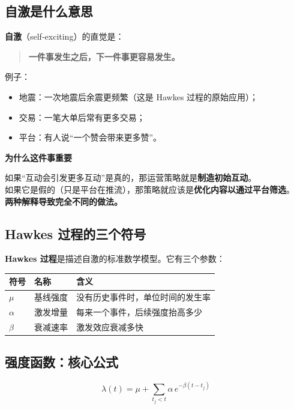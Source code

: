 \documentclass[UTF8,a4paper,11pt]{ctexart}
\newenvironment{explainbox}[1]
{\begin{center}\begin{minipage}{0.94\textwidth}\colorbox{boxbg}{\parbox{0.92\textwidth}{\textbf{#1}\par\vspace{2pt}}}}
{\end{minipage}\end{center}}
\newcommand{\term}[1]{\textbf{#1}}
\begin{document}
\subsection{自激是什么意思}

\term{自激}（self-exciting）的直觉是：

\begin{quote}
\textbf{一件事发生之后，下一件事更容易发生。}
\end{quote}

例子：
\begin{itemize}[leftmargin=1.6em]
\item 地震：一次地震后余震更频繁（这是 Hawkes 过程的原始应用）；
\item 交易：一笔大单后常有更多交易；
\item 平台：有人说“一个赞会带来更多赞”。
\end{itemize}

\begin{explainbox}{为什么这件事重要}
如果“互动会引发更多互动”是真的，那运营策略就是\textbf{制造初始互动}。\\
如果它是假的（只是平台在推流），那策略就应该是\textbf{优化内容以通过平台筛选}。\\
\textbf{两种解释导致完全不同的做法。}
\end{explainbox}

\subsection{Hawkes 过程的三个符号}

\term{Hawkes 过程}是描述自激的标准数学模型。它有三个参数：

\begin{longtable}{@{}p{2.0cm}p{2.2cm}p{9.6cm}@{}}
\toprule
\textbf{符号} & \textbf{名称} & \textbf{含义} \\
\midrule
$\mu$ & 基线强度 & 没有历史事件时，单位时间的发生率 \\
$\alpha$ & 激发增量 & 每来一个事件，后续强度抬高多少 \\
$\beta$ & 衰减速率 & 激发效应衰减多快 \\
\bottomrule
\end{longtable}

\subsection{强度函数：核心公式}

\begin{equation}
\lambda(t) = \mu + \sum_{t_j < t} \alpha\, e^{-\beta (t - t_j)}
\label{p2:eq:intensity}
\end{equation}
\end{document}
